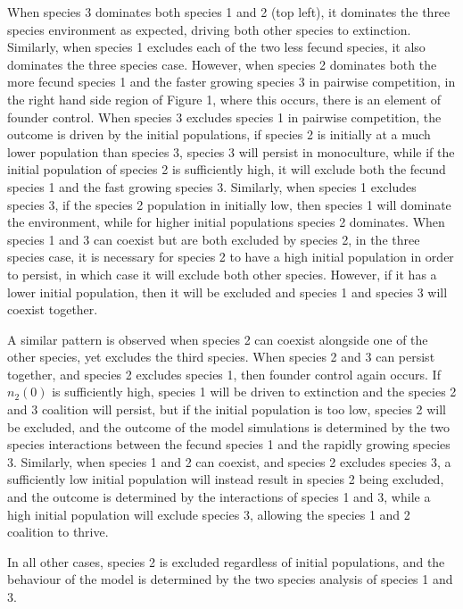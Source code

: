 \documentclass[preprint,10pt,reqno]{amsart}
\begin{document}
When species 3 dominates both species 1 and 2 (top left), it dominates the three species environment as expected, driving both other species to extinction. Similarly, when species 1 excludes each of the two less fecund species, it also dominates the three species case. However, when species 2 dominates both the more fecund species 1 and the faster growing species 3 in pairwise competition, in the right hand side region of Figure 1, where this occurs, there is an element of founder control. When species 3 excludes species 1 in pairwise competition, the outcome is driven by the initial populations, if species 2 is initially at a much lower population than species 3, species 3 will persist in monoculture, while if the initial population of species 2 is sufficiently high, it will exclude both the fecund species 1 and the fast growing species 3. Similarly, when species 1 excludes species 3, if the species 2 population in initially low, then species 1 will dominate the environment, while for higher initial populations species 2 dominates. When species 1 and 3 can coexist but are both excluded by species 2, in the three species case, it is necessary for species 2 to have a high initial population in order to persist, in which case it will exclude both other species. However, if it has a lower initial population, then it will be excluded and species 1 and species 3 will coexist together.

A similar pattern is observed when species 2 can coexist alongside one of the other species, yet excludes the third species. When species 2 and 3 can persist together, and species 2 excludes species 1, then founder control again occurs. If $n_2(0)$ is sufficiently high, species 1 will be driven to extinction and the species 2 and 3 coalition will persist, but if the initial population is too low, species 2 will be excluded, and the outcome of the model simulations is determined by the two species interactions between the fecund species 1 and the rapidly growing species 3. Similarly, when species 1 and 2 can coexist, and species 2 excludes species 3, a sufficiently low initial population will instead result in species 2 being excluded, and the outcome is determined by the interactions of species 1 and 3, while a high initial population will exclude species 3, allowing the species 1 and 2 coalition to thrive.

In all other cases, species 2 is excluded regardless of initial populations, and the behaviour of the model is determined by the two species analysis of species 1 and 3.
\end{document}
